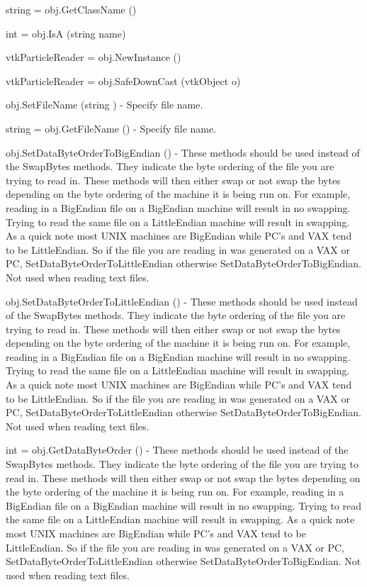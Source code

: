 \begin{DoxyItemize}
\item {\ttfamily string = obj.\-Get\-Class\-Name ()}  
\item {\ttfamily int = obj.\-Is\-A (string name)}  
\item {\ttfamily vtk\-Particle\-Reader = obj.\-New\-Instance ()}  
\item {\ttfamily vtk\-Particle\-Reader = obj.\-Safe\-Down\-Cast (vtk\-Object o)}  
\item {\ttfamily obj.\-Set\-File\-Name (string )} -\/ Specify file name.  
\item {\ttfamily string = obj.\-Get\-File\-Name ()} -\/ Specify file name.  
\item {\ttfamily obj.\-Set\-Data\-Byte\-Order\-To\-Big\-Endian ()} -\/ These methods should be used instead of the Swap\-Bytes methods. They indicate the byte ordering of the file you are trying to read in. These methods will then either swap or not swap the bytes depending on the byte ordering of the machine it is being run on. For example, reading in a Big\-Endian file on a Big\-Endian machine will result in no swapping. Trying to read the same file on a Little\-Endian machine will result in swapping. As a quick note most U\-N\-I\-X machines are Big\-Endian while P\-C's and V\-A\-X tend to be Little\-Endian. So if the file you are reading in was generated on a V\-A\-X or P\-C, Set\-Data\-Byte\-Order\-To\-Little\-Endian otherwise Set\-Data\-Byte\-Order\-To\-Big\-Endian. Not used when reading text files.  
\item {\ttfamily obj.\-Set\-Data\-Byte\-Order\-To\-Little\-Endian ()} -\/ These methods should be used instead of the Swap\-Bytes methods. They indicate the byte ordering of the file you are trying to read in. These methods will then either swap or not swap the bytes depending on the byte ordering of the machine it is being run on. For example, reading in a Big\-Endian file on a Big\-Endian machine will result in no swapping. Trying to read the same file on a Little\-Endian machine will result in swapping. As a quick note most U\-N\-I\-X machines are Big\-Endian while P\-C's and V\-A\-X tend to be Little\-Endian. So if the file you are reading in was generated on a V\-A\-X or P\-C, Set\-Data\-Byte\-Order\-To\-Little\-Endian otherwise Set\-Data\-Byte\-Order\-To\-Big\-Endian. Not used when reading text files.  
\item {\ttfamily int = obj.\-Get\-Data\-Byte\-Order ()} -\/ These methods should be used instead of the Swap\-Bytes methods. They indicate the byte ordering of the file you are trying to read in. These methods will then either swap or not swap the bytes depending on the byte ordering of the machine it is being run on. For example, reading in a Big\-Endian file on a Big\-Endian machine will result in no swapping. Trying to read the same file on a Little\-Endian machine will result in swapping. As a quick note most U\-N\-I\-X machines are Big\-Endian while P\-C's and V\-A\-X tend to be Little\-Endian. So if the file you are reading in was generated on a V\-A\-X or P\-C, Set\-Data\-Byte\-Order\-To\-Little\-Endian otherwise Set\-Data\-Byte\-Order\-To\-Big\-Endian. Not used when reading text files.  

\end{DoxyItemize}
